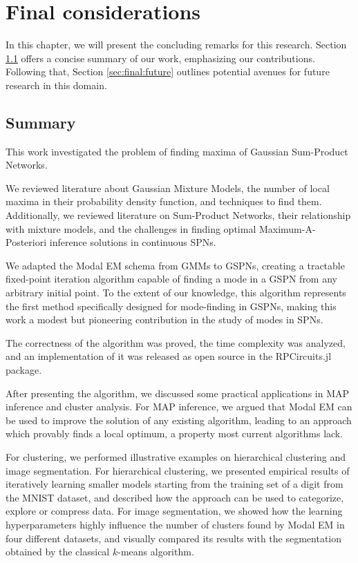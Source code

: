 \chapter{Final considerations}
\label{cap:final}

In this chapter, we will present the concluding remarks for this research. Section \ref{sec:final:summary} offers a concise summary of our work, emphasizing our contributions. Following that, Section \ref{sec:final:future} outlines potential avenues for future research in this domain.

\section{Summary}
\label{sec:final:summary}

This work investigated the problem of finding maxima of Gaussian Sum-Product Networks.

We reviewed literature about Gaussian Mixture Models, the number of local maxima in their probability density function, and techniques to find them. Additionally, we reviewed literature on Sum-Product Networks, their relationship with mixture models, and the challenges in finding optimal Maximum-A-Posteriori inference solutions in continuous SPNs.

We adapted the Modal EM schema from GMMs to GSPNs, creating a tractable fixed-point iteration algorithm capable of finding a mode in a GSPN from any arbitrary initial point. To the extent of our knowledge, this algorithm represents the first method specifically designed for mode-finding in GSPNs, making this work a modest but pioneering contribution in the study of modes in SPNs.

The correctness of the algorithm was proved, the time complexity was analyzed, and an implementation of it was released as open source in the RPCircuits.jl package.

After presenting the algorithm, we discussed some practical applications in MAP inference and cluster analysis. For MAP inference, we argued that Modal EM can be used to improve the solution of any existing algorithm, leading to an approach which provably finds a local optimum, a property most current algorithms lack.

For clustering, we performed illustrative examples on hierarchical clustering and image segmentation. For hierarchical clustering, we presented empirical results of iteratively learning smaller models starting from the training set of a digit from the MNIST dataset, and described how the approach can be used to categorize, explore or compress data. For image segmentation, we showed how the learning hyperparameters highly influence the number of clusters found by Modal EM in four different datasets, and visually compared its results with the segmentation obtained by the classical $k$-means algorithm.

